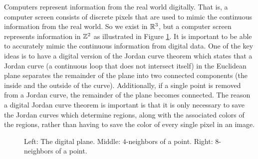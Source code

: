 \begin{comment}
	\item This statement is true. Since $C_1$ and $C_2$ are closed, we know that $C_1 = \overline{C_1}$ and $C_2 = \overline{C_2}$. By Exercise \ref{ex:product_closure} we know that 
	\[C_1 \times C_2 = \overline{C_1} \times \overline{C_2} = \overline{C_1 \times C_2}.\]
	So $C_1 \times C_2$ is closed in $X_1 \times X_2$. 
		
	\item This statement is true. Since $C_1 \times C_2$ is closed, we know that $C_1 \times C_2 = \overline{C_1 \times C_2}$. By Exercise \ref{ex:product_closure} we know that 
	\[C_1 \times C_2 = \overline{C_1 \times C_2} = \overline{C_1} \times \overline{C_2}.\]
	So $C_1 = \overline{C_1}$ and $C_2 = \overline{C_2}$ and $C_1$ and $C_2$ are closed. 
			
	\ea

\end{comment}

\ee


\label{sec_prod_top_app}

Computers represent information from the real world digitally. That is, a computer screen consists of discrete pixels that are used to mimic the continuous information from the real world. So we exist in $\mathbb{R}^3$, but a computer screen represents information in $\mathbb{Z}^2$ as illustrated in Figure \ref{F:Digital_plane}. It is important to be able to accurately mimic the continuous information from digital data. One of the key ideas is to have a digital version of the Jordan curve theorem which states that a Jordan curve (a continuous loop that does not intersect itself) in the Euclidean plane separates the remainder of the  plane into two connected components (the inside and the outside of the curve). Additionally, if a single point is removed from a Jordan curve, the remainder of the plane becomes connected. The reason a digital Jordan curve theorem is important is that it is only necessary to save the Jordan curves which determine regions, along with the associated colors of the regions, rather than having to save the color of every single pixel in an image. 

\begin{figure}[t]
\begin{center}
 \hspace{0.25in}  \hspace{0.25in} 
\caption{Left: The digital plane. Middle: $4$-neighbors of a point. Right: $8$-neighbors of a point.}
\label{F:Digital_plane}
\end{center}
\end{figure}

